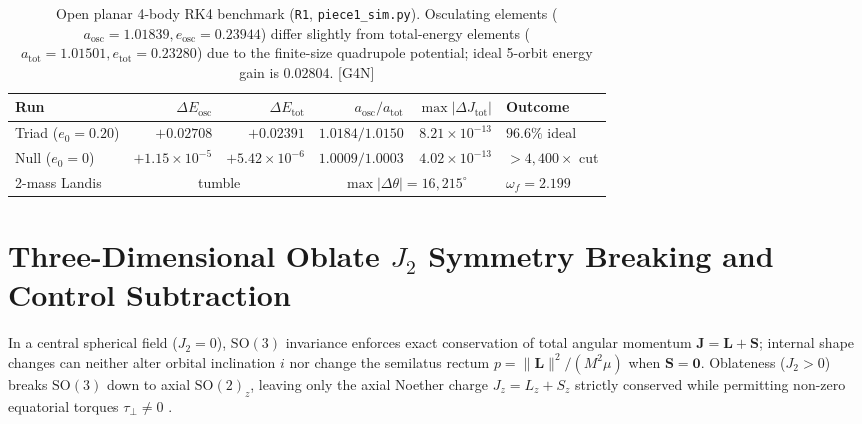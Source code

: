 \documentclass[11pt]{amsart}
\numberwithin{equation}{section}
\theoremstyle{plain}
\theoremstyle{definition}\newtheorem{definition}[theorem]{Definition}
\theoremstyle{remark}\newtheorem{remark}[theorem]{Remark}
\newcommand{\SO}{\mathrm{SO}}
\newcommand{\ctag}[1]{\textup{\textsf{\scriptsize[#1]}}}
\begin{document}
\begin{table}[htbp]\centering\scriptsize\setlength{\tabcolsep}{2.5pt}
\begin{tabular}{lrrrrl}\toprule
Run & $\Delta E_{\mathrm{osc}}$ & $\Delta E_{\mathrm{tot}}$ & $a_{\mathrm{osc}}/a_{\mathrm{tot}}$ & $\max|\Delta J_{\mathrm{tot}}|$ & Outcome \\\midrule
Triad ($e_0{=}0.20$) & $+0.02708$ & $+0.02391$ & $1.0184/1.0150$ & $8.21{\times}10^{-13}$ & $96.6\%$ ideal \\
Null ($e_0{=}0$) & $+1.15{\times}10^{-5}$ & $+5.42{\times}10^{-6}$ & $1.0009/1.0003$ & $4.02{\times}10^{-13}$ & ${>}4{,}400{\times}$ cut \\
2-mass Landis & \multicolumn{2}{c}{tumble} & \multicolumn{2}{c}{$\max|\Delta\theta|=16{,}215^\circ$} & $\omega_f=2.199$ \\\bottomrule
\end{tabular}
\caption{Open planar 4-body RK4 benchmark (\texttt{R1}, \texttt{piece1\_sim.py}). Osculating elements ($a_{\mathrm{osc}}=1.01839, e_{\mathrm{osc}}=0.23944$) differ slightly from total-energy elements ($a_{\mathrm{tot}}=1.01501, e_{\mathrm{tot}}=0.23280$) due to the finite-size quadrupole potential; ideal 5-orbit energy gain is $0.02804$. \ctag{G4N}}\label{tab:R1}
\end{table}

\section{Three-Dimensional Oblate \texorpdfstring{$J_2$}{J2} Symmetry Breaking and Control Subtraction}
In a central spherical field ($J_2 = 0$), $\SO(3)$ invariance enforces exact conservation of total angular momentum $\mathbf{J} = \mathbf{L} + \mathbf{S}$; internal shape changes can neither alter orbital inclination $i$ nor change the semilatus rectum $p = \|\mathbf{L}\|^2 / (M^2\mu)$ when $\mathbf{S} = \mathbf{0}$. Oblateness ($J_2 > 0$) breaks $\SO(3)$ down to axial $\SO(2)_z$, leaving only the axial Noether charge $J_z = L_z + S_z$ strictly conserved while permitting non-zero equatorial torques $\tau_\perp \neq 0$ \cite{brouwer1959,kaula1966}.
\end{document}
